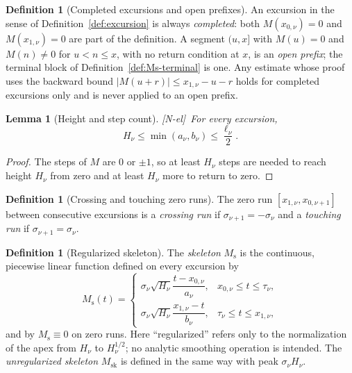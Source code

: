 \documentclass[11pt,reqno]{amsart}
\numberwithin{equation}{section}
\theoremstyle{plain}
\newtheorem{lemma}[theorem]{Lemma}
\theoremstyle{definition}
\newtheorem{definition}[theorem]{Definition}
\theoremstyle{remark}
\newcommand{\Ms}{M_{\mathrm{s}}}
\newcommand{\Msk}{M_{\mathrm{sk}}}
\newcommand{\tagNE}{\textup{[N-el]}}
\begin{document}
\begin{definition}[Completed excursions and open prefixes]
\label{def:completed-open}
An excursion in the sense of Definition~\ref{def:excursion} is always
\emph{completed}: both $M(x_{0,\nu})=0$ and $M(x_{1,\nu})=0$ are part of
the definition. A segment $(u,x]$ with $M(u)=0$ and $M(n)\ne0$ for
$u<n\le x$, with no return condition at $x$, is an \emph{open prefix}; the
terminal block of Definition~\ref{def:Ms-terminal} is one. Any estimate
whose proof uses the backward bound $|M(u+r)|\le x_{1,\nu}-u-r$ holds for
completed excursions only and is never applied to an open prefix.
\end{definition}

\begin{lemma}[Height and step count]
\label{lem:height_steps}
\tagNE\ For every excursion,
\begin{equation}
\label{eq:height_steps}
H_\nu\le\min(a_\nu,b_\nu)\le\frac{\ell_\nu}{2}.
\end{equation}
\end{lemma}

\begin{proof}
The steps of $M$ are $0$ or $\pm1$, so at least $H_\nu$ steps are needed to
reach height $H_\nu$ from zero and at least $H_\nu$ more to return to zero.
\end{proof}

\begin{definition}[Crossing and touching zero runs]
\label{def:crossing_touching}
The zero run $[x_{1,\nu},x_{0,\nu+1}]$ between consecutive excursions is a
\emph{crossing run} if $\sigma_{\nu+1}=-\sigma_\nu$ and a \emph{touching run}
if $\sigma_{\nu+1}=\sigma_\nu$.
\end{definition}

\begin{definition}[Regularized skeleton]
\label{def:Ms}
The \emph{skeleton} $\Ms$ is the continuous, piecewise linear function
defined on every excursion by
\begin{equation}
\label{eq:Ms_def}
\Ms(t)=
\begin{cases}
\sigma_\nu\sqrt{H_\nu}\dfrac{t-x_{0,\nu}}{a_\nu},
 &x_{0,\nu}\le t\le\tau_\nu,\\[2ex]
\sigma_\nu\sqrt{H_\nu}\dfrac{x_{1,\nu}-t}{b_\nu},
 &\tau_\nu\le t\le x_{1,\nu},
\end{cases}
\end{equation}
and by $\Ms\equiv0$ on zero runs.  Here ``regularized'' refers only to
the normalization of the apex from $H_\nu$ to $H_\nu^{1/2}$; no analytic
smoothing operation is intended.  The \emph{unregularized skeleton} $\Msk$
is defined in the same way with peak $\sigma_\nu H_\nu$.
\end{definition}
\end{document}
